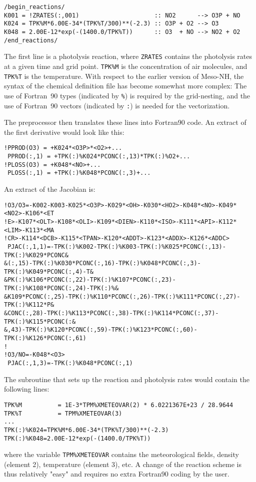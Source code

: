 {\small
\begin{verbatim}
/begin_reactions/
K001 = !ZRATES(:,001)                     :: NO2      --> O3P + NO
K024 = TPK%M*6.00E-34*(TPK%T/300)**(-2.3) :: O3P + O2 --> O3
K048 = 2.00E-12*exp(-(1400.0/TPK%T))      :: O3  + NO --> NO2 + O2
/end_reactions/
\end{verbatim}
}
The first line is a photolysis reaction, where {\tt ZRATES} contains
the photolysis rates at a given time and grid point.
{\tt TPK\%M} is the concentration of air molecules, and {\tt TPK\%T} is
the temperature.  With respect to the earlier version of Meso-NH,
the syntax of the chemical definition file has become somewhat more
complex: The use of Fortran~90 types (indicated by {\tt \%}) is
required by the grid-nesting, and the use of Fortran~90 vectors
(indicated by {\tt :}) is needed for the vectorization.

The preprocessor then translates these lines into Fortran90 code.
An extract of  the first derivative would look like this:
{\small
\begin{verbatim}
!PPROD(O3) = +K024*<O3P>*<O2>+...
 PPROD(:,1) = +TPK(:)%K024*PCONC(:,13)*TPK(:)%O2+...
!PLOSS(O3) = +K048*<NO>+...
 PLOSS(:,1) = +TPK(:)%K048*PCONC(:,3)+...
\end{verbatim}
}

An extract of the Jacobian is:
{\small
\begin{verbatim}
!O3/O3=-K002-K003-K025*<O3P>-K029*<OH>-K030*<HO2>-K048*<NO>-K049*<NO2>-K106*<ET
!E>-K107*<OLT>-K108*<OLI>-K109*<DIEN>-K110*<ISO>-K111*<API>-K112*<LIM>-K113*<MA
!CR>-K114*<DCB>-K115*<TPAN>-K120*<ADDT>-K123*<ADDX>-K126*<ADDC>
 PJAC(:,1,1)=-TPK(:)%K002-TPK(:)%K003-TPK(:)%K025*PCONC(:,13)-TPK(:)%K029*PCONC&
&(:,15)-TPK(:)%K030*PCONC(:,16)-TPK(:)%K048*PCONC(:,3)-TPK(:)%K049*PCONC(:,4)-T&
&PK(:)%K106*PCONC(:,22)-TPK(:)%K107*PCONC(:,23)-TPK(:)%K108*PCONC(:,24)-TPK(:)%&
&K109*PCONC(:,25)-TPK(:)%K110*PCONC(:,26)-TPK(:)%K111*PCONC(:,27)-TPK(:)%K112*P&
&CONC(:,28)-TPK(:)%K113*PCONC(:,38)-TPK(:)%K114*PCONC(:,37)-TPK(:)%K115*PCONC(:&
&,43)-TPK(:)%K120*PCONC(:,59)-TPK(:)%K123*PCONC(:,60)-TPK(:)%K126*PCONC(:,61)
!
!O3/NO=-K048*<O3>
 PJAC(:,1,3)=-TPK(:)%K048*PCONC(:,1)
\end{verbatim}
}

The subroutine that sets up the reaction and photolysis rates would
contain the following lines:
{\small
\begin{verbatim}
TPK%M          = 1E-3*TPM%XMETEOVAR(2) * 6.0221367E+23 / 28.9644
TPK%T          = TPM%XMETEOVAR(3)
...
TPK(:)%K024=TPK%M*6.00E-34*(TPK%T/300)**(-2.3)
TPK(:)%K048=2.00E-12*exp(-(1400.0/TPK%T))
\end{verbatim}
}
where the variable {\tt TPM\%XMETEOVAR} contains the
meteorological fields, density (element 2), temperature (element 3), etc.
A change of the reaction scheme is thus relatively "easy" and requires
no extra Fortran90 coding by the user.
